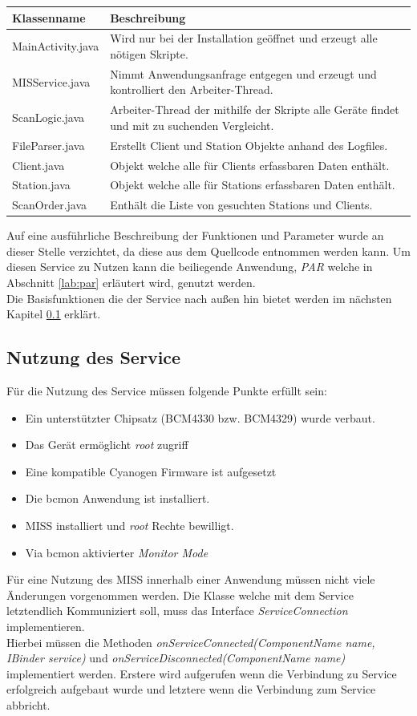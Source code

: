\documentclass[]{report}
\begin{document}
\begin{center}
  \begin{tabulary}{\textwidth}{l | L}
  \toprule
  Klassenname & Beschreibung \\
  \midrule
  MainActivity.java & Wird nur bei der Installation geöffnet und erzeugt alle nötigen Skripte.\\
  MISService.java & Nimmt Anwendungsanfrage entgegen und erzeugt und kontrolliert den Arbeiter-Thread. \\
  ScanLogic.java & Arbeiter-Thread der mithilfe der Skripte alle Geräte findet und mit zu suchenden Vergleicht. \\
  FileParser.java & Erstellt Client und Station Objekte anhand des Logfiles. \\
  Client.java & Objekt welche alle für Clients erfassbaren Daten enthält. \\
  Station.java & Objekt welche alle für Stations erfassbaren Daten enthält. \\ 
  ScanOrder.java & Enthält die Liste von gesuchten Stations und Clients. \\
  \bottomrule
  \end{tabulary}  
\end{center}
Auf eine ausführliche Beschreibung der Funktionen und Parameter wurde an dieser Stelle verzichtet, da diese aus dem Quellcode entnommen werden kann. Um diesen Service zu Nutzen kann die beiliegende Anwendung, \textit{PAR} welche in Abschnitt \ref{lab:par} erläutert wird, genutzt werden. \\
Die Basisfunktionen die der Service nach außen hin bietet werden im nächsten Kapitel \ref{lab:usage} erklärt. 
\subsection{Nutzung des Service}\label{lab:usage}
Für die Nutzung des Service müssen folgende Punkte erfüllt sein:
\begin{itemize}
\item Ein unterstützter Chipsatz (BCM4330 bzw. BCM4329) wurde verbaut.
\item Das Gerät ermöglicht \textit{root} zugriff
\item Eine kompatible Cyanogen Firmware ist aufgesetzt
\item Die bcmon Anwendung ist installiert.
\item MISS installiert und \textit{root} Rechte bewilligt.
\item Via bcmon aktivierter \textit{Monitor Mode}
\end{itemize}
Für eine Nutzung des MISS innerhalb einer Anwendung müssen nicht viele Änderungen vorgenommen werden. Die Klasse welche mit dem Service letztendlich Kommuniziert soll, muss das Interface \textit{ServiceConnection} implementieren.\\
Hierbei müssen die Methoden \textit{onServiceConnected(ComponentName name, IBinder service)} und \textit{onServiceDisconnected(ComponentName name)} implementiert werden. Erstere wird aufgerufen wenn die Verbindung zu Service erfolgreich aufgebaut wurde und letztere wenn die Verbindung zum Service abbricht. \\
\end{document}
